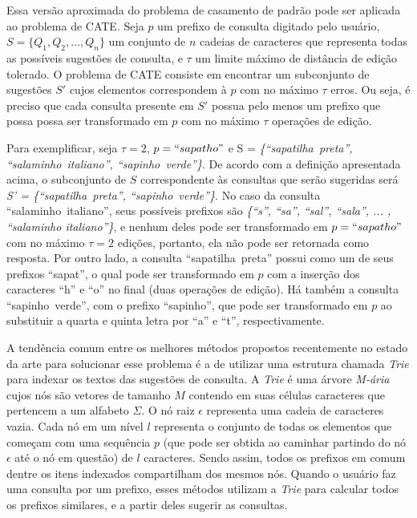 Essa versão aproximada do problema de casamento de padrão pode ser aplicada ao problema de CATE. Seja $p$ um prefixo de consulta digitado pelo usuário, $S=\{Q_{1}, Q_{2}, ... , Q_{n}\}$ um conjunto de $n$ cadeias de caracteres que representa todas as possíveis sugestões de consulta, e $\tau$ um limite máximo de distância de edição tolerado. O problema de CATE consiste em encontrar um subconjunto de sugestões $S'$ cujos elementos correspondem à $p$ com no máximo $\tau$ erros. Ou seja, é preciso que cada consulta presente em $S'$ possua pelo menos um prefixo que possa possa ser transformado em $p$ com no máximo $\tau$ operações de edição.

Para exemplificar, seja $\tau = 2$, $p = ``sapatho"$ e S = \textit{\{``sapatilha\ preta'', ``salaminho\ italiano'', ``sapinho\ verde''\}}. De acordo com a definição apresentada acima, o subconjunto de $S$ correspondente às consultas que serão sugeridas será \textit{S' = \{``sapatilha\ preta'', ``sapinho\ verde''\}}. No caso da consulta ``salaminho\ italiano'', seus possíveis prefixos são \textit{\{``s'', ``sa'', ``sal'', ``sala'', ... , ``salaminho italiano''\}}, e nenhum deles pode ser transformado em $p = ``sapatho"$ com no máximo $\tau = 2$ edições, portanto, ela não pode ser retornada como resposta. Por outro lado, a consulta ``sapatilha\ preta'' possui como um de seus prefixos ``sapat'', o qual pode ser transformado em $p$ com a inserção dos caracteres ``h'' e ``o'' no final (duas operações de edição). Há também a consulta ``sapinho\ verde'', com o prefixo ``sapinho'', que pode ser transformado em $p$ ao substituir a quarta e quinta letra por ``a'' e ``t'', respectivamente.

A tendência comum entre os melhores métodos propostos recentemente no estado da arte para solucionar esse problema \citep{chaudhuri2009extending,ji2009efficient,li2011efficient, xiao2013efficient,deng2016meta, zhou2016beva} é a de utilizar uma estrutura chamada  \textit{Trie} \citep{fredkintrie1960} para indexar os textos das sugestões de consulta. A \textit{Trie} é uma árvore \textit{M-ária} cujos nós são vetores de tamanho $M$ contendo em suas células caracteres que pertencem a um alfabeto $\Sigma$. O nó raiz $\epsilon$ representa uma cadeia de caracteres vazia. Cada nó em um nível $l$ representa o conjunto de todas os elementos que começam com uma sequência $p$ (que pode ser obtida ao caminhar partindo do nó $\epsilon$ até o nó em questão) de $l$ caracteres. Sendo assim, todos os prefixos em comum dentre os itens indexados compartilham dos mesmos nós. Quando o usuário faz uma consulta por um prefixo, esses métodos utilizam a \textit{Trie} para calcular todos os prefixos similares, e a partir deles sugerir as consultas.


